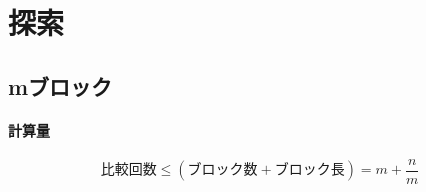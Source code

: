 \documentclass{ltjsarticle}
\begin{document}

\section{探索}
\subsection{mブロック}
\paragraph{計算量}
\begin{equation}
  \text{比較回数} \leq (\text{ブロック数} + \text{ブロック長}) = m + \frac{n}{m}
\end{equation}




\end{document}

